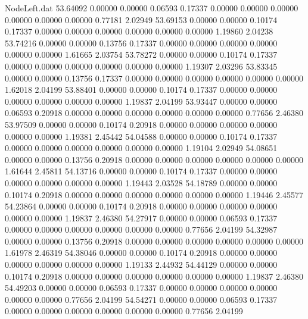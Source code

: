 \begin{filecontents}{NodeLeft.dat}
  53.64092    0.00000    0.00000     0.06593    0.17337    0.00000    0.00000    0.00000    0.00000    0.00000    0.00000    0.77181    2.02949
  53.69153    0.00000    0.00000     0.10174    0.17337    0.00000    0.00000    0.00000    0.00000    0.00000    0.00000    1.19860    2.04238
  53.74216    0.00000    0.00000     0.13756    0.17337    0.00000    0.00000    0.00000    0.00000    0.00000    0.00000    1.61665    2.03754
  53.78272    0.00000    0.00000     0.10174    0.17337    0.00000    0.00000    0.00000    0.00000    0.00000    0.00000    1.19307    2.03296
  53.83345    0.00000    0.00000     0.13756    0.17337    0.00000    0.00000    0.00000    0.00000    0.00000    0.00000    1.62018    2.04199
  53.88401    0.00000    0.00000     0.10174    0.17337    0.00000    0.00000    0.00000    0.00000    0.00000    0.00000    1.19837    2.04199
  53.93447    0.00000    0.00000     0.06593    0.20918    0.00000    0.00000    0.00000    0.00000    0.00000    0.00000    0.77656    2.46380
  53.97509    0.00000    0.00000     0.10174    0.20918    0.00000    0.00000    0.00000    0.00000    0.00000    0.00000    1.19381    2.45442
  54.04588    0.00000    0.00000     0.10174    0.17337    0.00000    0.00000    0.00000    0.00000    0.00000    0.00000    1.19104    2.02949
  54.08651    0.00000    0.00000     0.13756    0.20918    0.00000    0.00000    0.00000    0.00000    0.00000    0.00000    1.61644    2.45811
  54.13716    0.00000    0.00000     0.10174    0.17337    0.00000    0.00000    0.00000    0.00000    0.00000    0.00000    1.19443    2.03528
  54.18789    0.00000    0.00000     0.10174    0.20918    0.00000    0.00000    0.00000    0.00000    0.00000    0.00000    1.19446    2.45577
  54.23864    0.00000    0.00000     0.10174    0.20918    0.00000    0.00000    0.00000    0.00000    0.00000    0.00000    1.19837    2.46380
  54.27917    0.00000    0.00000     0.06593    0.17337    0.00000    0.00000    0.00000    0.00000    0.00000    0.00000    0.77656    2.04199
  54.32987    0.00000    0.00000     0.13756    0.20918    0.00000    0.00000    0.00000    0.00000    0.00000    0.00000    1.61978    2.46319
  54.38046    0.00000    0.00000     0.10174    0.20918    0.00000    0.00000    0.00000    0.00000    0.00000    0.00000    1.19133    2.44932
  54.44129    0.00000    0.00000     0.10174    0.20918    0.00000    0.00000    0.00000    0.00000    0.00000    0.00000    1.19837    2.46380
  54.49203    0.00000    0.00000     0.06593    0.17337    0.00000    0.00000    0.00000    0.00000    0.00000    0.00000    0.77656    2.04199
  54.54271    0.00000    0.00000     0.06593    0.17337    0.00000    0.00000    0.00000    0.00000    0.00000    0.00000    0.77656    2.04199

\end{filecontents}

